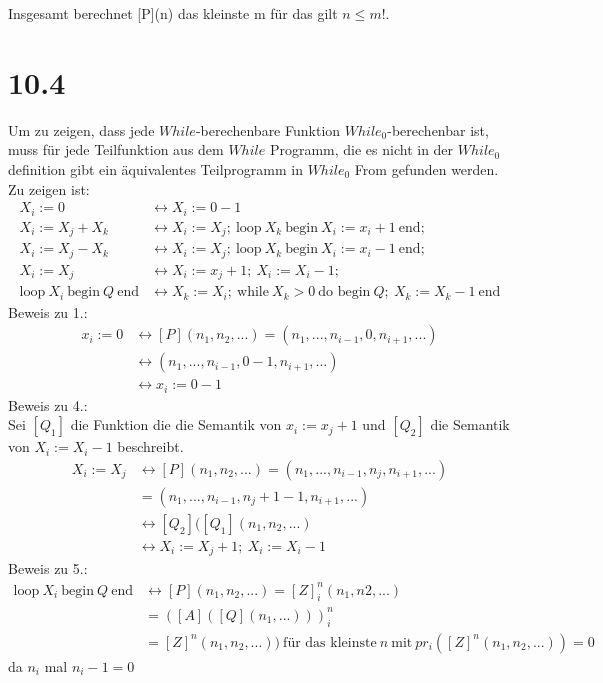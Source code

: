 \documentclass[12pt, a4paper]{article}
\begin{document}
Insgesamt berechnet [P](n) das kleinste m für das gilt $n \le m!$.

\section*{10.4}
Um zu zeigen, dass jede $While$-berechenbare Funktion $While_0$-berechenbar ist, muss f\"ur jede Teilfunktion aus dem $While$ Programm, die es nicht in der $While_0$ definition gibt ein \"aquivalentes Teilprogramm in $While_0$ From gefunden werden. Zu zeigen ist:
\begin{align}
X_i := 0 &\leftrightarrow X_i := 0-1\\
X_i := X_j + X_k &\leftrightarrow X_i := X_j;\ \text{loop} \ X_k \ \text{begin} \ X_i := x_i+1 \ \text{end};\\
X_i := X_j - X_k &\leftrightarrow X_i := X_j;\ \text{loop}\ X_k\ \text{begin}\ X_i := x_i-1\ \text{end};\\
X_i := X_j &\leftrightarrow X_i := x_j+1;\ X_i := X_i-1;\\
\text{loop}\ X_i \ \text{begin}\ Q\ \text{end} &\leftrightarrow X_k := X_i;\ \text{while}\ X_k >  0\ \text{do begin}\ Q;\ X_k:=X_k-1\ \text{end}
\end{align}
Beweis zu 1.:\\
\begin{align*}
x_i:= 0 &\leftrightarrow [P](n_1, n_2, ...)=(n_1, ..., n_{i-1}, 0, n_{i+1}, ...)\\
&\leftrightarrow (n_1,...,n_{i-1}, 0-1,n_{i+1},...)\\
&\leftrightarrow x_i:=0-1
\end{align*}
Beweis zu 4.:\\
Sei $[Q_1]$ die Funktion die die Semantik von $x_i:=x_j +1$ und $[Q_2]$ die Semantik von $X_i:=X_i -1$ beschreibt.
\begin{align*}
X_i:= X_j &\leftrightarrow [P](n_1,n_2,...) = (n_1,...,n_{i-1},n_j,n_{i+1},...)\\
&= (n_1,...,n_{i-1}, n_j+1-1, n_{i+1},...)\\
&\leftrightarrow [Q_2]([Q_1](n_1,n_2,...)\\
&\leftrightarrow X_i:=X_j+1;\ X_i:=X_i-1
\end{align*}
Beweis zu 5.:
\begin{align*}
\text{loop}\ X_i \ \text{begin}\ Q\ \text{end} &\leftrightarrow [P](n_1,n_2,...)=[Z]^n_i(n_1,n2,...) \\
&=([A]([Q](n_1,...)))^n_i\\
&=[Z]^n(n_1,n_2,...)) \ \text{f\"ur das kleinste}\ n\ \text{mit}\ pr_i([Z]^n(n_1,n_2,...))=0
\end{align*}
da $n_i$ mal $n_i-1=0$
\end{document}
